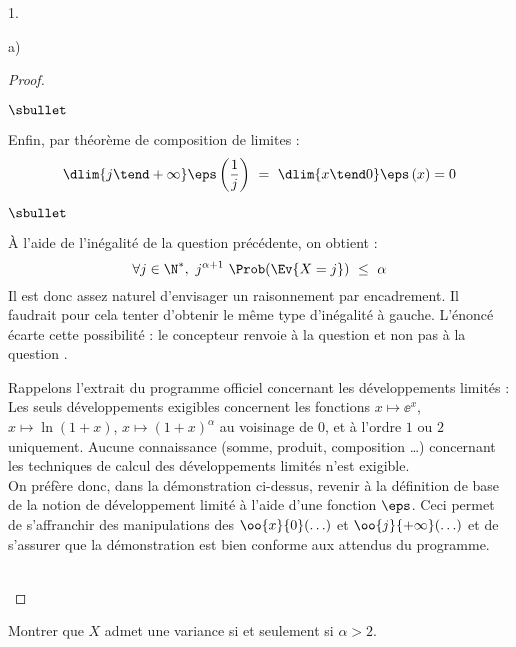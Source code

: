 \begin{noliste}{1.}
\begin{noliste}{a)}
\begin{proof}
\begin{noliste}{$\sbullet$}
      \item Enfin, par théorème de composition de limites :
        \[
        \dlim{j \tend +\infty} \eps\left( \dfrac{1}{j} \right) \ = \
        \dlim{x \tend 0} \eps\left( x \right) = 0
        \]
      \end{noliste}
      \begin{remark}%
        \begin{noliste}{$\sbullet$}
        \item À l'aide de l'inégalité de la question précédente, on
          obtient :
          \[
          \forall j \in \N^*, \ j^{\alpha + 1} \ \Prob(\Ev{X = j})
          \ \leq \ \alpha
          \]
          Il est donc assez naturel d'envisager un raisonnement par
          encadrement. Il faudrait pour cela tenter d'obtenir le même
          type d'inégalité à gauche. L'énoncé écarte cette possibilité
          : le concepteur renvoie à la question \itbf{3.c)} et non pas
          à la question \itbf{3.d)}.

        \item Rappelons l'extrait du programme officiel concernant les
          développements limités : \og Les seuls développements
          exigibles concernent les fonctions $x\mapsto \ee^x$, $x
          \mapsto \ln (1+x)$, $x \mapsto (1+x)^\alpha$ au voisinage de
          $0$, et à l'ordre $1$ ou $2$ uniquement. Aucune connaissance
          (somme, produit, composition \ldots) concernant les
          techniques de calcul des développements limités n'est
          \hbox{exigible.} \fg{}\\
          On préfère donc, dans la démonstration ci-dessus, revenir à
          la définition de base de la notion de développement limité à
          l'aide d'une fonction $\eps$. Ceci permet de s'affranchir
          des manipulations des $\oo{x}{0}(\ldots)$ et
          $\oo{j}{+\infty}(\ldots)$ et de s'assurer que la
          démonstration est bien conforme aux attendus du programme.
        \end{noliste}
      \end{remark}~\\[-1.4cm]
    \end{proof}

    
    \newpage


  \item Montrer que $X$ admet une variance si et seulement si $\alpha 
    >2$. 


\end{noliste}
\end{noliste}
